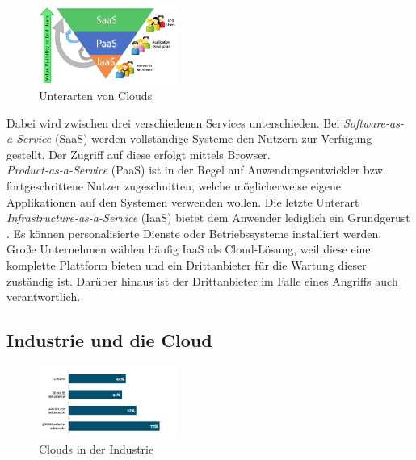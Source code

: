 \documentclass[conference]{IEEEtran}
\begin{document}
\begin{figure}[h]
\centering
  \includegraphics[width=0.4\textwidth]{clouds}
  \caption{Unterarten von Clouds}
  \label{fig:difclouds}
\end{figure}

Dabei wird zwischen drei verschiedenen Services unterschieden. Bei \textit{Software-as-a-Service} (SaaS) werden vollständige Systeme den Nutzern zur Verfügung gestellt. Der Zugriff auf diese erfolgt mittels Browser.\\
\textit{Product-as-a-Service} (PaaS) ist in der Regel auf Anwendungsentwickler bzw. fortgeschrittene Nutzer zugeschnitten, welche möglicherweise eigene Applikationen auf den Systemen verwenden wollen. Die letzte Unterart \textit{Infrastructure-as-a-Service} (IaaS) bietet dem Anwender lediglich ein Grundgerüst \cite{channel2015}. Es können personalisierte Dienste oder Betriebssysteme installiert werden. Große Unternehmen wählen häufig IaaS als Cloud-Lösung, weil diese eine komplette Plattform bieten und ein Drittanbieter für die Wartung dieser zuständig ist. Darüber hinaus ist der Drittanbieter im Falle eines Angriffs auch verantwortlich.

\subsection{Industrie und die Cloud}
\begin{figure}[h]
\centering
  \includegraphics[width=0.4\textwidth]{firmen}
  \caption{Clouds in der Industrie}
  \label{fig:clouds}
\end{figure}
\end{document}
